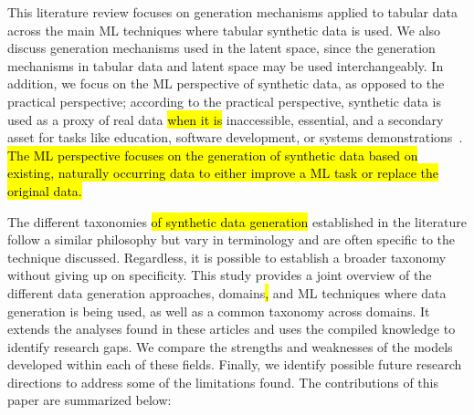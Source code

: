This literature review focuses on generation mechanisms applied to tabular
data across the main ML techniques where tabular synthetic data is used.  We
also discuss generation mechanisms used in the latent space, since the
generation mechanisms in tabular data and latent space may be used
interchangeably. In addition, we focus on the ML perspective of synthetic
data, as opposed to the practical perspective; according to the practical
perspective, synthetic data is used as a proxy of real data\hl{ when it is}
inaccessible, essential, and a secondary asset for tasks like education,
software development, or systems demonstrations~\cite{mannino2019real}.
\hl{The ML perspective focuses on the generation of synthetic data based on
existing, naturally occurring data to either improve a ML task or replace the
original data.} 

The different taxonomies \hl{of synthetic data generation }established in the
literature follow a similar philosophy\hl{ }but vary in terminology and are
often specific to the technique discussed. Regardless, it is possible to
establish a broader taxonomy without giving up on specificity. This study
provides a joint overview of the different data generation approaches,
domains\hl{,} and ML techniques where data generation is being used, as well
as a common taxonomy across domains. It extends the analyses found in these
articles and uses the compiled knowledge to identify research gaps. We compare
the strengths and weaknesses of the models developed within each of these
fields. Finally, we identify possible future research directions to address
some of the limitations found. The contributions of this paper are summarized
below:

